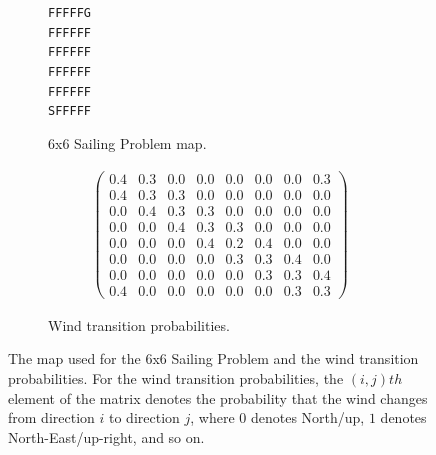             \begin{figure}
                 \centering
                 \begin{subfigure}[b]{0.49\textwidth}
                     \centering
                     \texttt{FFFFFG} \\
                     \texttt{FFFFFF} \\
                     \texttt{FFFFFF} \\
                     \texttt{FFFFFF} \\
                     \texttt{FFFFFF} \\
                     \texttt{SFFFFF} 
                     \caption{6x6 Sailing Problem map.}
                 \end{subfigure}
                 \hfill
                 \begin{subfigure}[b]{0.49\textwidth}
                     \centering
                     \begin{align*}
                         \begin{pmatrix}
                            0.4 & 0.3 & 0.0 & 0.0 & 0.0 & 0.0 & 0.0 & 0.3 \\
                            0.4 & 0.3 & 0.3 & 0.0 & 0.0 & 0.0 & 0.0 & 0.0 \\
                            0.0 & 0.4 & 0.3 & 0.3 & 0.0 & 0.0 & 0.0 & 0.0 \\
                            0.0 & 0.0 & 0.4 & 0.3 & 0.3 & 0.0 & 0.0 & 0.0 \\
                            0.0 & 0.0 & 0.0 & 0.4 & 0.2 & 0.4 & 0.0 & 0.0 \\
                            0.0 & 0.0 & 0.0 & 0.0 & 0.3 & 0.3 & 0.4 & 0.0 \\
                            0.0 & 0.0 & 0.0 & 0.0 & 0.0 & 0.3 & 0.3 & 0.4 \\
                            0.4 & 0.0 & 0.0 & 0.0 & 0.0 & 0.0 & 0.3 & 0.3 
                         \end{pmatrix}
                     \end{align*}
                     \caption{Wind transition probabilities.}
                 \end{subfigure}
                    \caption{The map used for the 6x6 Sailing Problem and the wind transition probabilities. For the wind transition probabilities, the $(i,j)th$ element of the matrix denotes the probability that the wind changes from direction $i$ to direction $j$, where $0$ denotes North/up, $1$ denotes North-East/up-right, and so on.}
                    \label{fig:sailing_deets}
            \end{figure}

